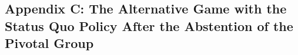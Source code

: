 



\clearpage
\subsection{Appendix C: The Alternative Game with the Status Quo Policy After the Abstention of the Pivotal Group}

